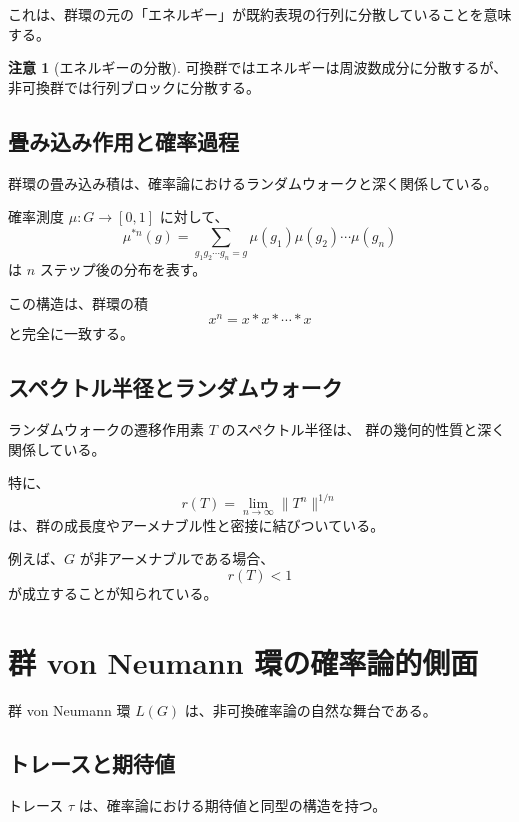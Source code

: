 \documentclass[12pt,a4paper]{ltjarticle}
\theoremstyle{definition}
\newtheorem*{remark}{注意}
\begin{document}
これは、群環の元の「エネルギー」が既約表現の行列に分散していることを意味する。

\begin{remark}[エネルギーの分散]
可換群ではエネルギーは周波数成分に分散するが、
非可換群では行列ブロックに分散する。
\end{remark}

\subsection{畳み込み作用と確率過程}

群環の畳み込み積は、確率論におけるランダムウォークと深く関係している。

確率測度 $\mu : G \to [0,1]$ に対して、
\[
\mu^{*n}(g) = \sum_{g_1 g_2 \cdots g_n = g} \mu(g_1)\mu(g_2)\cdots\mu(g_n)
\]
は $n$ ステップ後の分布を表す。

この構造は、群環の積
\[
x^n = x * x * \cdots * x
\]
と完全に一致する。

\subsection{スペクトル半径とランダムウォーク}

ランダムウォークの遷移作用素 $T$ のスペクトル半径は、
群の幾何的性質と深く関係している。

特に、
\[
r(T) = \lim_{n \to \infty} \|T^n\|^{1/n}
\]
は、群の成長度やアーメナブル性と密接に結びついている。

例えば、$G$ が非アーメナブルである場合、
\[
r(T) < 1
\]
が成立することが知られている。

\section{群 von Neumann 環の確率論的側面}

群 von Neumann 環 $L(G)$ は、非可換確率論の自然な舞台である。

\subsection{トレースと期待値}

トレース $\tau$ は、確率論における期待値と同型の構造を持つ。
\end{document}
